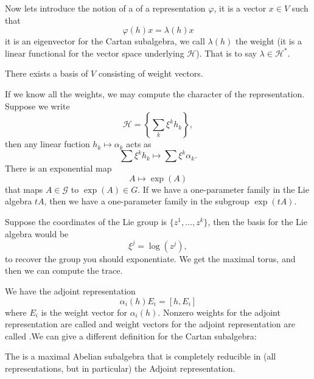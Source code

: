 Now lets introduce the notion of a  of a
representation $\varphi$, it is a vector $x\in V$ such that
\begin{equation}
\varphi(h)x=\lambda(h)x
\end{equation}
it is an eigenvector for the Cartan subalgebra, we call
$\lambda(h)$ the weight (it is a linear functional for the vector
space underlying $\mathscr{H}$). That is to say
$\lambda\in\mathscr{H}^{*}$. 

\begin{prop}
There exists a basis of $V$ consisting of weight vectors.
\end{prop}

If we know all the weights, we may compute the character of the
representation. Suppose we write
\begin{equation}
\mathscr{H}=\left\{\sum_{k}\xi^{k}h_{k}\right\},
\end{equation}
then any linear fuction $h_{k}\mapsto\alpha_{k}$ acts as
\begin{equation}
\sum \xi^{k}h_{k}\mapsto \sum\xi^{k}\alpha_{k}.
\end{equation}
There is an exponential map
\begin{equation}
A\mapsto\exp(A)
\end{equation}
that maps $A\in\mathscr{G}$ to $\exp(A)\in G$. If we have a
one-parameter family in the Lie algebra $tA$, then we have a
one-parameter family in the subgroup $\exp(tA)$.

Suppose the coordinates of the Lie group is
$\{z^{1},\ldots,z^{k}\}$, then the basis for the Lie algebra
would be
\begin{equation}
\xi^{j}=\log(z^{j}),
\end{equation}
to recover the group you should exponentiate. We get the maximal
torus, and then we can compute the trace.

We have the adjoint representation
\begin{equation}
\alpha_{i}(h)E_{i} = [h,E_{i}]
\end{equation}
where $E_{i}$ is the weight vector for $\alpha_{i}(h)$. Nonzero
weights for the adjoint representation are called 
and weight vectors for the adjoint representation are
called .We can give a
different definition for the Cartan subalgebra:
\begin{defn}
The  is a maximal Abelian subalgebra
that is completely reducible in (all representations, but in
particular) the Adjoint representation.
\end{defn}


